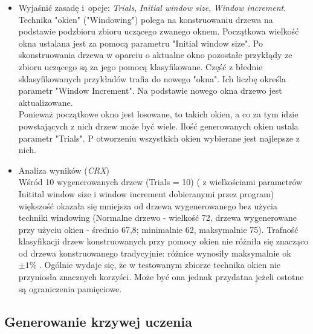 \begin{itemize}
\item Wyjaśnić zasadę i~opcje: \emph{Trials}, \emph{Initial window size}, \emph{Window increment}.
\\Technika "okien" ("Windowing") polega na konstruowaniu drzewa na podstawie podzbioru zbioru uczącego zwanego oknem. Początkowa wielkość okna ustalana jest za pomocą parametru "Initial window size". Po skonstruowania drzewa w oparciu o aktualne okno pozostałe przykłądy ze zbioru uczącego są za jego pomocą klasyfikowane. Część z błednie sklasyfikowanych przykładów trafia do nowego "okna". Ich liczbę określa parametr "Window Increment". Na podstawie nowego okna drzewo jest aktualizowane.
\\Ponieważ początkowe okno jest losowane, to takich okien, a co za tym idzie powstających z nich drzew może być wiele. Ilość generowanych okien ustala parametr "Trials". P otworzeniu wszystkich okien wybierane jest najlepsze z nich.
\item Analiza wyników (\emph{CRX})
\\Wśród 10 wygenerowanych drzew (Trials = 10) ( z wielkościami parametrów Initital window size i window increment dobieranymi przez program) większość okazała się mniejsza od drzewa wygenerowanego bez użycia techniki windowing (Normalne drzewo - wielkość 72, drzewa wygenerowane przy użyciu okien - średnio 67,8; minimalnie 62, maksymalnie 75). Trafność klasyfikacji drzew konstruowanych przy pomocy okien nie różniła się znacząco od drzewa konstruowanego tradycyjnie: różnice wynosiły maksymalnie ok $ \pm 1\% $ . Ogólnie wydaje się, że w testowanym zbiorze technika okien nie przyniosła znacznych korzyści. Może być ona jednak przydatna jeżeli ostotne są ograniczenia pamięciowe.
\end{itemize}

\subsection{Generowanie krzywej uczenia}

